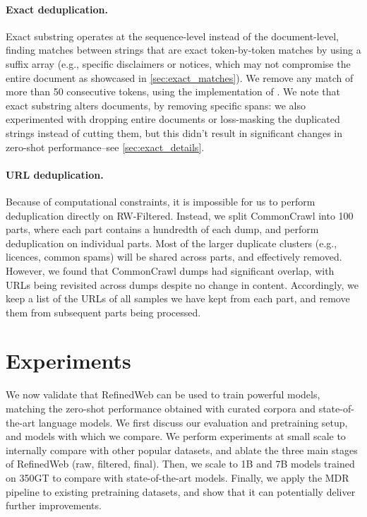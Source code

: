 \paragraph{Exact deduplication.} Exact substring operates at the sequence-level instead of the document-level, finding matches between strings that are exact token-by-token matches by using a suffix array \cite{manber1993suffix} (e.g., specific disclaimers or notices, which may not compromise the entire document as showcased in \ref{sec:exact_matches}). We remove any match of more than 50 consecutive tokens, using the implementation of \citet{lee2022deduplicating}. We note that exact substring alters documents, by removing specific spans: we also experimented with dropping entire documents or loss-masking the duplicated strings instead of cutting them, but this didn't result in significant changes in zero-shot performance--see \ref{sec:exact_details}. 

\paragraph{URL deduplication.} Because of computational constraints, it is impossible for us to perform deduplication directly on RW-Filtered. Instead, we split CommonCrawl into 100 parts, where each part contains a hundredth of each dump, and perform deduplication on individual parts. Most of the larger duplicate clusters (e.g., licences, common spams) will be shared across parts, and effectively removed. However, we found that CommonCrawl dumps had significant overlap, with URLs being revisited across dumps despite no change in content. Accordingly, we keep a list of the URLs of all samples we have kept from each part, and remove them from subsequent parts being processed.

\section{Experiments}

We now validate that RefinedWeb can be used to train powerful models, matching the zero-shot performance obtained with curated corpora and state-of-the-art language models. We first discuss our evaluation and pretraining setup, and models with which we compare. We perform experiments at small scale to internally compare with other popular datasets, and ablate the three main stages of RefinedWeb (raw, filtered, final). Then, we scale to 1B and 7B models trained on 350GT to compare with state-of-the-art models. Finally, we apply the MDR pipeline to existing pretraining datasets, and show that it can potentially deliver further improvements. 

